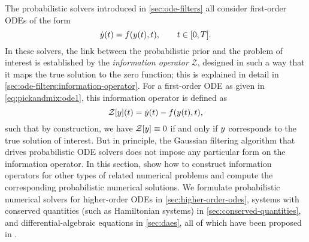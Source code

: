 \documentclass{mimosis}
\begin{document}
The probabilistic solvers introduced in
\cref{sec:ode-filters}
all consider
first-order ODEs of the form
\begin{equation}
  \label{eq:pickandmix:ode1}
  \dot{\val}(t) = \vf(\val(t), t), \qquad t \in [0, T].
\end{equation}
In these solvers, the link between the probabilistic prior and the problem of interest is established by the \emph{information operator}
\(\mathcal{Z}\),
designed in such a way that it maps the true solution to the zero function;
this is explained in detail in \cref{sec:ode-filters:information-operator}.
For a first-order ODE as given in \cref{eq:pickandmix:ode1}, this information operator is defined as
\begin{equation}
  \label{eq:pickandmix:infoop}
  \mathcal{Z}[\val](t) = \dot{\val}(t) - \vf(\val(t), t),
\end{equation}
such that by construction, we have \(\mathcal{Z}[y] \equiv 0\) if and only if \(y\) corresponds to the true solution of interest.
But in principle, the Gaussian filtering algorithm that drives probabilistic ODE solvers does not impose any particular form on the information operator.
In this section,
show how to construct information operators for other types of related numerical problems and compute the corresponding probabilistic numerical solutions.
We formulate probabilistic numerical solvers for higher-order ODEs
in \cref{sec:higher-order-odes},
systems with conserved quantities (such as Hamiltonian systems)
in \cref{sec:conserved-quantities},
and differential-algebraic equations
in \cref{sec:daes},
all of which have been proposed in \pickandmix{}.

\newpage
\end{document}
